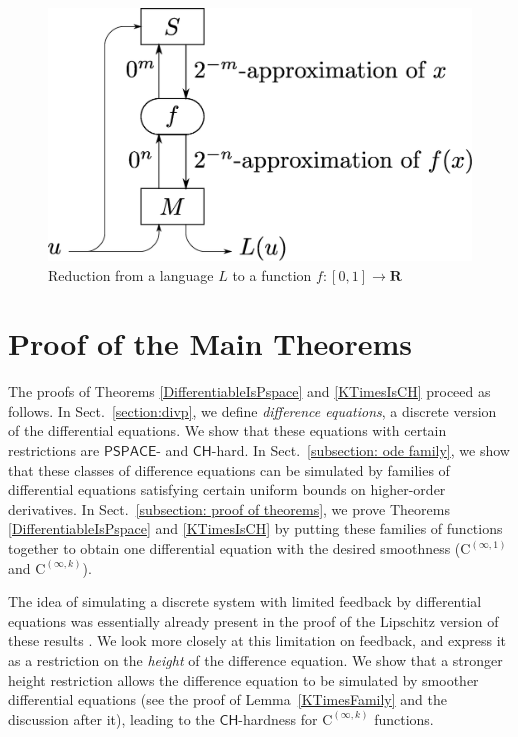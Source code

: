 \documentclass{lmcs}
\theoremstyle{definition}
\theoremstyle{remark}
\newcommand{\R}{\mathbf R}
\newcommand{\classPSPACE}{\mathsf{PSPACE}}
\newcommand{\classCH}{\mathsf{CH}}
\newcommand{\classC}{\mathrm C}
\begin{document}
 \begin{figure}
  \begin{center}
  \includegraphics[scale=0.25]{image/reduction.eps}
  \caption{Reduction from a language $L$ to a function $f \colon [0,1] \to \R$}
  \label{fig:reduction}
  \end{center}
 \end{figure}


\section{Proof of the Main Theorems}
\label{section:differentiable}

The proofs of Theorems \ref{DifferentiableIsPspace} and \ref{KTimesIsCH}
proceed as follows. 
In Sect.~\ref{section:divp}, 
we define \emph{difference equations}, 
a discrete version of the differential equations. 
We show that these equations with certain restrictions 
are $\classPSPACE$- and $\classCH$-hard. 
In Sect.~\ref{subsection: ode family}, 
we show that these classes of difference equations can be simulated
by families of differential equations 
satisfying certain uniform bounds on higher-order derivatives. 
In Sect.~\ref{subsection: proof of theorems}, 
we prove Theorems \ref{DifferentiableIsPspace} and \ref{KTimesIsCH} by
putting these families of functions together 
to obtain one differential equation 
with the desired smoothness 
($\classC ^{(\infty, 1)}$ and $\classC ^{(\infty, k)}$). 

The idea of simulating a discrete system with limited feedback 
by differential equations
was essentially already present in the proof of 
the Lipschitz version of these results \cite{kawamura2010lipschitz}. 
We look more closely at this limitation on feedback, 
and express it as a restriction on the \emph{height}
of the difference equation. 
We show that a stronger height restriction allows
the difference equation to be simulated by 
smoother differential equations 
(see the proof of Lemma~\ref{KTimesFamily} and the discussion after it), 
leading to the $\classCH$-hardness for $\classC ^{(\infty, k)}$ functions.
\end{document}
